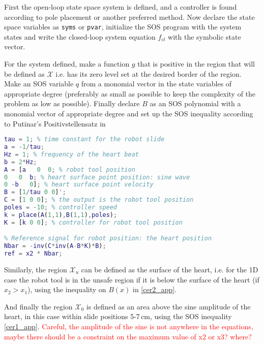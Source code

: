 First the open-loop state space system is defined, and a controller is found according to pole placement or another preferred method. Now declare the state space variables as \verb|syms| or \verb|pvar|, initialize the SOS program with the system states and write the closed-loop system equation $f_{cl}$ with the symbolic state vector.

For the system defined, make a function $g$ that is positive in the region that will be defined as $\mathcal{X}$ i.e. has its zero level set at the desired border of the region. Make an SOS variable $q$ from a monomial vector in the state variables of appropriate degree (preferably as small as possible to keep the complexity of the problem as low as possible). Finally declare $B$ as an SOS polynomial with a monomial vector of appropriate degree and set up the SOS inequality according to Putinar's Positivstellensatz in

\begin{lstlisting}[language=matlab]
% Define state-space system with x1 = robot position, x2 = heart position, x3 = heart velocity
tau = 1; % time constant for the robot slide
a = -1/tau;
Hz = 1; % frequency of the heart beat
b = 2*Hz;
A = [a   0  0; % robot tool position
0   0  b; % heart surface point position: sine wave
0 -b   0]; % heart surface point velocity
B = [1/tau 0 0]';
C = [1 0 0]; % the output is the robot tool position
poles = -10; % controller speed
k = place(A(1,1),B(1,1),poles);
K = [k 0 0]; % controller for robot tool position

% Reference signal for robot position: the heart position
Nbar = -inv(C*inv(A-B*K)*B);
ref = x2 * Nbar;
\end{lstlisting}

Similarly, the region $\mathcal{X}_u$ can be defined as the surface of the heart, i.e. for the 1D case the robot tool is in the unsafe region if it is below the surface of the heart (if $x_2>x_1$), using the inequality on $B(x)$ in \autoref{cer2_app}.

And finally the region $\mathcal{X}_0$ is defined as an area above the sine amplitude of the heart, in this case within slide positions 5-7\,cm, using the SOS inequality \autoref{cer1_app}. 
\textcolor{red}{Careful, the amplitude of the sine is not anywhere in the equations, maybe there should be a constraint on the maximum value of x2 or x3? where?}